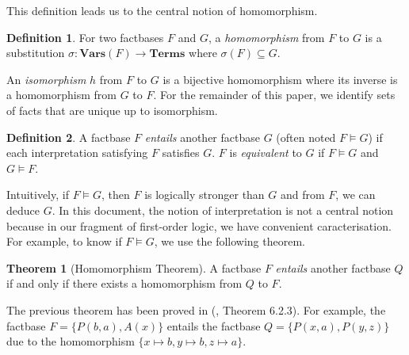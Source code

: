 \documentclass{article}
\theoremstyle{definition}
\newtheorem{definition}{Definition}[section]
\newtheorem{theorem}{Theorem}[section]
\theoremstyle{remark}
\newtheorem{remark}{Remark}[section]
\newcommand{\Vars}{\textbf{Vars}}
\newcommand{\Terms}{\textbf{Terms}}
\begin{document}
This definition leads us to the central notion of homomorphism.

\begin{definition}
For two factbases $F$ and $G$, a \emph{homomorphism} from $F$ to $G$ is a substitution $\sigma:\Vars(F) \to \Terms$ where $\sigma(F) \subseteq G$. 
\end{definition}

An \emph{isomorphism} $h$ from $F$ to $G$ is a bijective homomorphism where its inverse is a homomorphism from $G$ to $F$. For the remainder of this paper, we identify sets of facts that are unique up to isomorphism. 

\begin{definition}
	A factbase $F$ \emph{entails} another factbase $G$ (often noted $F \vDash G$) if each interpretation satisfying $F$ satisfies $G$. $F$ is \emph{equivalent} to $G$ if $F \vDash G$ and $G \vDash F$.
\end{definition}
	
Intuitively, if $F \vDash G$, then $F$ is logically stronger than $G$ and from $F$, we can deduce $G$. In this document, the notion of interpretation is not a central notion because in our fragment of first-order logic, we have convenient caracterisation. For example, to know if $F \vDash G$, we use the following theorem.




\begin{theorem}[Homomorphism Theorem] \label{hom_thm}
A factbase $F$ \emph{entails} another factbase $Q$ if and only if there exists a homomorphism from $Q$ to $F$.
\end{theorem}

The previous theorem has been proved in (\cite{base}, Theorem 6.2.3). For example, the factbase $F = \{P(b,a),A(x)\}$ entails the factbase $Q = \{P(x,a),P(y,z)\}$ due to the homomorphism $\{x \mapsto b, y \mapsto b, z \mapsto a \}$.
\end{document}

